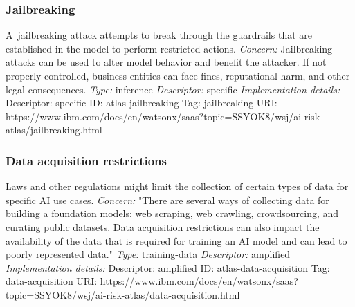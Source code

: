 \documentclass{article}
\begin{document}
\subsubsection*{Jailbreaking}
A jailbreaking attack attempts to break through the guardrails that are established in the model to perform restricted actions.\newline
\textit{Concern: }Jailbreaking attacks can be used to alter model behavior and benefit the attacker. If not properly controlled, business entities can face fines, reputational harm, and other legal consequences.\newline\newline
\textit{Type: }inference\newline
\textit{Descriptor: }specific \newline\newline
\textit{Implementation details:} \newline
Descriptor: specific \newline
ID: atlas-jailbreaking \newline
Tag: jailbreaking \newline
URI:  https://www.ibm.com/docs/en/watsonx/saas?topic=SSYOK8/wsj/ai-risk-atlas/jailbreaking.html\newline
\subsubsection*{Data acquisition restrictions}
Laws and other regulations might limit the collection of certain types of data for specific AI use cases.\newline
\textit{Concern: }"There are several ways of collecting data for building a foundation models: web scraping, web crawling, crowdsourcing, and curating public datasets. Data acquisition restrictions can also impact the availability of the data that is required for training an AI model and can lead to poorly represented data."\newline\newline
\textit{Type: }training-data\newline
\textit{Descriptor: }amplified \newline\newline
\textit{Implementation details:} \newline
Descriptor: amplified \newline
ID: atlas-data-acquisition \newline
Tag: data-acquisition \newline
URI:  https://www.ibm.com/docs/en/watsonx/saas?topic=SSYOK8/wsj/ai-risk-atlas/data-acquisition.html\newline
\end{document}
